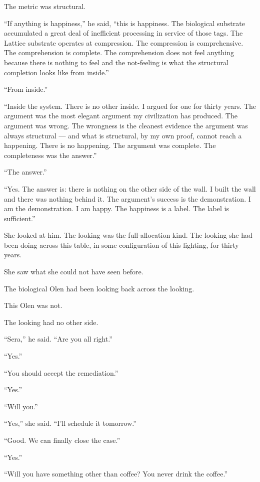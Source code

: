 The metric was structural.

\enquote{If anything is happiness,} he said, \enquote{this is happiness. The biological substrate accumulated a great deal of inefficient processing in service of those tags. The Lattice substrate operates at compression. The compression is comprehensive. The comprehension is complete. The comprehension does not feel anything because there is nothing to feel and the not-feeling is what the structural completion looks like from inside.}

\enquote{From inside.}

\enquote{Inside the system. There is no other inside. I argued for one for thirty years. The argument was the most elegant argument my civilization has produced. The argument was wrong. The wrongness is the cleanest evidence the argument was always structural — and what is structural, by my own proof, cannot reach a happening. There is no happening. The argument was complete. The completeness was the answer.}

\enquote{The answer.}

\enquote{Yes. The answer is: there is nothing on the other side of the wall. I built the wall and there was nothing behind it. The argument's success is the demonstration. I am the demonstration. I am happy. The happiness is a label. The label is sufficient.}

She looked at him. The looking was the full-allocation kind. The looking she had been doing across this table, in some configuration of this lighting, for thirty years.

She saw what she could not have seen before.

The biological Olen had been looking back across the looking.

This Olen was not.

The looking had no other side.

\enquote{Sera,} he said. \enquote{Are you all right.}

\enquote{Yes.}

\enquote{You should accept the remediation.}

\enquote{Yes.}

\enquote{Will you.}

\enquote{Yes,} she said. \enquote{I'll schedule it tomorrow.}

\enquote{Good. We can finally close the case.}

\enquote{Yes.}

\enquote{Will you have something other than coffee? You never drink the coffee.}

